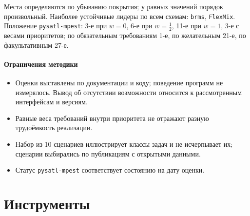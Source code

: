 \documentclass[10pt,a4paper]{article}
\begin{document}
Места определяются по убыванию покрытия; у равных значений порядок произвольный. Наиболее устойчивые лидеры по всем схемам:
\texttt{brms}, \texttt{FlexMix}.
Положение \texttt{pysatl-mpest}: 3-е при $w{=}0$, 6-е при $w{=}\tfrac12$, 11-е при $w{=}1$, 3-е с весами приоритетов;
по обязательным требованиям 1-е, по желательным 21-е, по факультативным 27-е.

\subsection{Ограничения методики}
\begin{itemize}
\item Оценки выставлены по документации и коду; поведение программ не измерялось. Вывод об отсутствии возможности относится к рассмотренным интерфейсам и версиям.
\item Равные веса требований внутри приоритета не отражают разную трудоёмкость реализации.
\item Набор из 10 сценариев иллюстрирует классы задач и не исчерпывает их; сценарии выбирались по публикациям с открытыми данными.
\item Статус \texttt{pysatl-mpest} соответствует состоянию на дату оценки.
\end{itemize}

\part{Инструменты}
\end{document}
